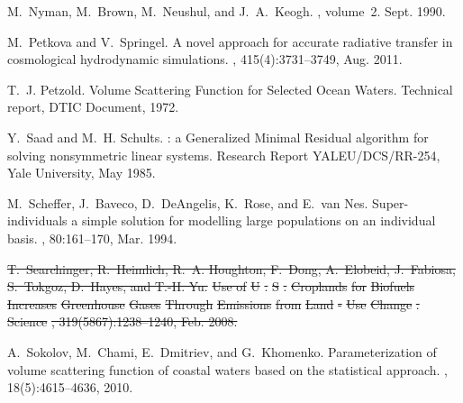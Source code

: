 \documentclass[ms,cpyr,lof,lot]{uathesis}
\providecommand{\DIFdel}[1]{{\protect\color{red}\sout{#1}}}                      %
\providecommand{\DIFdelbegin}{} %
\providecommand{\DIFdelend}{} %
\newcommand{\DIFscaledelfig}{0.5}
\newlength{\DIFdelgraphicswidth} %
\newlength{\DIFdelgraphicsheight} %
\newcommand{\DIFdelincludegraphics}[2][]{%
\sbox{\DIFdelgraphicsbox}{\DIFOincludegraphics[#1]{#2}}%
\settoboxwidth{\DIFdelgraphicswidth}{\DIFdelgraphicsbox} %
\settoboxtotalheight{\DIFdelgraphicsheight}{\DIFdelgraphicsbox} %
\scalebox{\DIFscaledelfig}{%
\parbox[b]{\DIFdelgraphicswidth}{\usebox{\DIFdelgraphicsbox}\\[-\baselineskip] \rule{\DIFdelgraphicswidth}{0em}}\llap{\resizebox{\DIFdelgraphicswidth}{\DIFdelgraphicsheight}{%
\setlength{\unitlength}{\DIFdelgraphicswidth}%
\begin{picture}(1,1)%
\thicklines\linethickness{2pt} %
{\color[rgb]{1,0,0}\put(0,0){\framebox(1,1){}}}%
{\color[rgb]{1,0,0}\put(0,0){\line( 1,1){1}}}%
{\color[rgb]{1,0,0}\put(0,1){\line(1,-1){1}}}%
\end{picture}%
}\hspace*{3pt}}} %
} %
\DeclareRobustCommand{\DIFdelbegin}{\DIFOdelbegin \let\includegraphics\DIFdelincludegraphics} %
\DeclareRobustCommand{\DIFdelend}{\DIFOaddend \let\includegraphics\DIFOincludegraphics} %
\begin{document}
\begin{thebibliography}{10}
M.~Nyman, M.~Brown, M.~Neushul, and J.~A.~Keogh.
, volume~2.
\newblock Sept. 1990.

M.~Petkova and V.~Springel.
\newblock A novel approach for accurate radiative transfer in cosmological
  hydrodynamic simulations.
,
  415(4):3731--3749, Aug. 2011.

T.~J. Petzold.
\newblock Volume {Scattering} {Function} for {Selected} {Ocean} {Waters}.
\newblock Technical report, DTIC Document, 1972.

Y.~Saad and M.~H. Schults.
: a {Generalized} {Minimal} {Residual} algorithm for solving
  nonsymmetric linear systems.
\newblock Research {Report} YALEU/DCS/RR-254, Yale University, May 1985.

M.~Scheffer, J.~Baveco, D.~DeAngelis, K.~Rose, and E.~van Nes.
\newblock Super-individuals a simple solution for modelling large populations
  on an individual basis.
, 80:161--170, Mar. 1994.

\DIFdelbegin %
\DIFdel{T.~Searchinger, R.~Heimlich, R.~A. Houghton, F.~Dong, A.~Elobeid, J.~Fabiosa,
  S.~Tokgoz, D.~Hayes, and T.-H. Yu.
}%
\DIFdel{Use of }%
\DIFdel{U}%
\DIFdel{.}%
\DIFdel{S}%
\DIFdel{. }%
\DIFdel{Croplands}%
\DIFdel{for }%
\DIFdel{Biofuels}%
\DIFdel{Increases}%
\DIFdel{Greenhouse}%
\DIFdel{Gases}%
\DIFdel{Through}%
\DIFdel{Emissions}%
\DIFdel{from }%
\DIFdel{Land}%
\DIFdel{-}%
\DIFdel{Use}%
\DIFdel{Change}%
\DIFdel{.
}%
\DIFdel{Science}%
\DIFdel{, 319(5867):1238--1240, Feb. 2008.
}%

\DIFdelend {}
A.~Sokolov, M.~Chami, E.~Dmitriev, and G.~Khomenko.
\newblock Parameterization of volume scattering function of coastal waters
  based on the statistical approach.
, 18(5):4615--4636, 2010.


\end{thebibliography}
\end{document}
